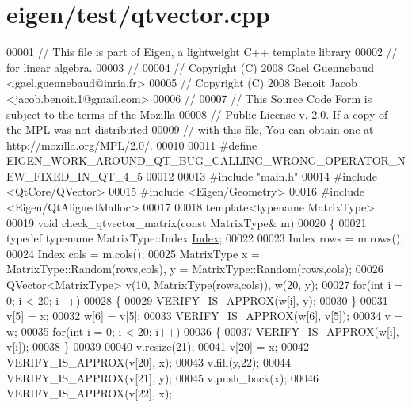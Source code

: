 \hypertarget{eigen_2test_2qtvector_8cpp_source}{}\section{eigen/test/qtvector.cpp}
\label{eigen_2test_2qtvector_8cpp_source}

\begin{DoxyCode}
00001 \textcolor{comment}{// This file is part of Eigen, a lightweight C++ template library}
00002 \textcolor{comment}{// for linear algebra.}
00003 \textcolor{comment}{//}
00004 \textcolor{comment}{// Copyright (C) 2008 Gael Guennebaud <gael.guennebaud@inria.fr>}
00005 \textcolor{comment}{// Copyright (C) 2008 Benoit Jacob <jacob.benoit.1@gmail.com>}
00006 \textcolor{comment}{//}
00007 \textcolor{comment}{// This Source Code Form is subject to the terms of the Mozilla}
00008 \textcolor{comment}{// Public License v. 2.0. If a copy of the MPL was not distributed}
00009 \textcolor{comment}{// with this file, You can obtain one at http://mozilla.org/MPL/2.0/.}
00010 
00011 \textcolor{preprocessor}{#define EIGEN\_WORK\_AROUND\_QT\_BUG\_CALLING\_WRONG\_OPERATOR\_NEW\_FIXED\_IN\_QT\_4\_5}
00012 
00013 \textcolor{preprocessor}{#include "main.h"}
00014 \textcolor{preprocessor}{#include <QtCore/QVector>}
00015 \textcolor{preprocessor}{#include <Eigen/Geometry>}
00016 \textcolor{preprocessor}{#include <Eigen/QtAlignedMalloc>}
00017 
00018 \textcolor{keyword}{template}<\textcolor{keyword}{typename} MatrixType>
00019 \textcolor{keywordtype}{void} check\_qtvector\_matrix(\textcolor{keyword}{const} MatrixType& m)
00020 \{
00021   \textcolor{keyword}{typedef} \textcolor{keyword}{typename} MatrixType::Index \hyperlink{namespace_eigen_a62e77e0933482dafde8fe197d9a2cfde}{Index};
00022 
00023   Index rows = m.rows();
00024   Index cols = m.cols();
00025   MatrixType x = MatrixType::Random(rows,cols), y = MatrixType::Random(rows,cols);
00026   QVector<MatrixType> v(10, MatrixType(rows,cols)), w(20, y);
00027   \textcolor{keywordflow}{for}(\textcolor{keywordtype}{int} i = 0; i < 20; i++)
00028   \{
00029     VERIFY\_IS\_APPROX(w[i], y);
00030   \}
00031   v[5] = x;
00032   w[6] = v[5];
00033   VERIFY\_IS\_APPROX(w[6], v[5]);
00034   v = w;
00035   \textcolor{keywordflow}{for}(\textcolor{keywordtype}{int} i = 0; i < 20; i++)
00036   \{
00037     VERIFY\_IS\_APPROX(w[i], v[i]);
00038   \}
00039 
00040   v.resize(21);
00041   v[20] = x;
00042   VERIFY\_IS\_APPROX(v[20], x);
00043   v.fill(y,22);
00044   VERIFY\_IS\_APPROX(v[21], y);
00045   v.push\_back(x);
00046   VERIFY\_IS\_APPROX(v[22], x);

\end{DoxyCode}
